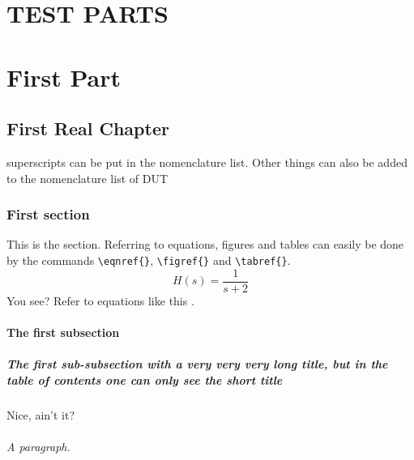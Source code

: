\part{TEST PARTS}
%
%
    \part{First Part}

    \chapter{First Real Chapter}

    superscripts can be put in the nomenclature  list. 
    Other things can also
    be added to the nomenclature list of \ac{DUT} 

        \section{First section}

        This is the section. Referring to equations, figures and tables can easily be done by the commands \verb"\eqnref{}",
        \verb"\figref{}" and \verb"\tabref{}".
        \begin{equation}\label{eq:First}
              H(s) = \frac{1}{s+2}
        \end{equation}
        You see? Refer to equations like this .
            \subsection{The first subsection}

                \subsubsection[Subsection Short Title]{The first sub-subsection with a very very very long title, but in the table of contents one can only see the short title}

                Nice, ain't it?

                    \paragraph{A paragraph.}
